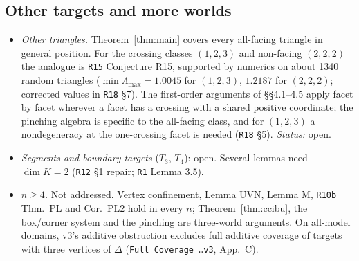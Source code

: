 \documentclass[11pt]{article}
\theoremstyle{definition}
\theoremstyle{remark}
\newcommand{\src}[1]{\texttt{#1}}
\begin{document}
\subsection{Other targets and more worlds}\label{sec:open-other}
\begin{itemize}[leftmargin=*]
\item \emph{Other triangles.} Theorem~\ref{thm:main} covers every all-facing triangle in general position. For the crossing classes $(1,2,3)$ and non-facing $(2,2,2)$ the analogue is \src{R15} Conjecture R15, supported by numerics on about 1340 random triangles ($\min\Lambda_{\max}=1.0045$ for $(1,2,3)$, $1.2187$ for $(2,2,2)$; corrected values in \src{R18} \S7). The first-order arguments of \S\S4.1--4.5 apply facet by facet wherever a facet has a crossing with a shared positive coordinate; the pinching algebra is specific to the all-facing class, and for $(1,2,3)$ a nondegeneracy at the one-crossing facet is needed (\src{R18} \S5). \emph{Status:} open.
\item \emph{Segments and boundary targets} ($T_3$, $T_4$): open. Several lemmas need $\dim K=2$ (\src{R12} \S1 repair; \src{R1} Lemma 3.5).
\item \emph{$n\ge4$.} Not addressed. Vertex confinement, Lemma UVN, Lemma M, \src{R10b} Thm.~PL and Cor.~PL2 hold in every $n$; Theorem~\ref{thm:ccibu}, the box/corner system and the pinching are three-world arguments. On all-model domains, v3's additive obstruction excludes full additive coverage of targets with three vertices of $\Delta$ (\src{Full Coverage \dots v3}, App.~C).
\end{itemize}
\end{document}
